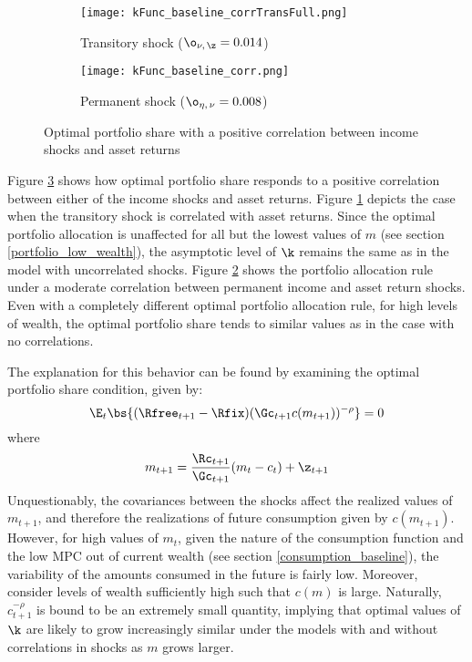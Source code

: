 \begin{figure}[h]
    \centering
    \begin{subfigure}{0.49\textwidth}
        \centering
        \texttt{[image: kFunc\_baseline\_corrTransFull.png]}
        \caption{Transitory shock ($\o_{\nu,\,\z} = 0.014$)}
        \label{subfig:correlated_baseline_transitory}
    \end{subfigure}
    \begin{subfigure}{0.49\textwidth}
        \centering
        \texttt{[image: kFunc\_baseline\_corr.png]}
        \caption{Permanent shock ($\o_{\eta,\,\nu} = 0.008$)}
        \label{subfig:correlated_baseline_permanent}
    \end{subfigure}
    \caption{Optimal portfolio share with a positive correlation between income shocks and asset returns}
    \label{fig:correlated_shock_baseline}
\end{figure}

Figure \ref{fig:correlated_shock_baseline} shows how optimal portfolio share responds to a positive correlation between either of the income shocks and asset returns. Figure \ref{subfig:correlated_baseline_transitory} depicts the case when the transitory shock is correlated with asset returns. Since the optimal portfolio allocation is unaffected for all but the lowest values of $m$ (see section \ref{portfolio_low_wealth}), the asymptotic level of $\k$ remains the same as in the model with uncorrelated shocks. Figure \ref{subfig:correlated_baseline_permanent} shows the portfolio allocation rule under a moderate correlation between permanent income and asset return shocks. Even with a completely different optimal portfolio allocation rule, for high levels of wealth, the optimal portfolio share tends to similar values as in the case with no correlations.

The explanation for this behavior can be found by examining the optimal portfolio share condition, given by:
\[
\E_{t}\bs{(\Rfree_{t+1} - \Rfix)(\Gc_{t+1}c(m_{t+1}))^{-\rho}} = 0
\]
where
\[
m_{t+1} = \frac{\Rc_{t+1}}{\Gc_{t+1}}(m_{t} - c_{t}) + \z_{t+1}
\]
Unquestionably, the covariances between the shocks affect the realized values of $m_{t+1}$, and therefore the realizations of future consumption given by $c(m_{t+1})$. However, for high values of $m_{t}$, given the nature of the consumption function and the low MPC out of current wealth (see section \ref{consumption_baseline}), the variability of the amounts consumed in the future is fairly low. Moreover, consider levels of wealth sufficiently high such that $c(m)$ is large. Naturally, $c_{t+1}^{-\rho}$ is bound to be an extremely small quantity, implying that optimal values of $\k$ are likely to grow increasingly similar under the models with and without correlations in shocks as $m$ grows larger.


